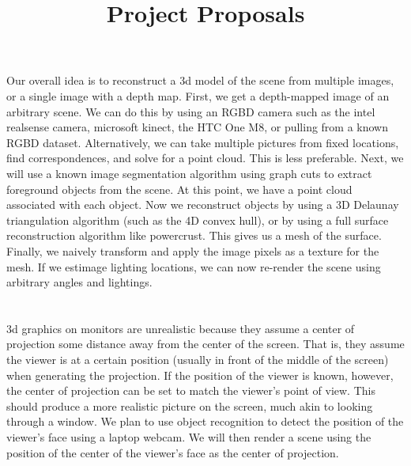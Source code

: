\documentclass[11pt]{article}
\title{Project Proposals}
\date{}
\begin{document}
\maketitle
\section{}
Our overall idea is to reconstruct a 3d model of the scene from multiple images, or a single image with a depth map. First, we get a depth-mapped image of an arbitrary scene. We can do this by using an RGBD camera such as the intel realsense camera, microsoft kinect, the   HTC One M8, or pulling from a known RGBD dataset. Alternatively, we can take multiple pictures from fixed locations, find correspondences, and solve for a point cloud. This is less preferable. Next, we will use a known image segmentation algorithm using graph cuts to extract foreground objects from the scene. At this point, we have a point cloud associated with each object. Now we reconstruct objects by using a 3D Delaunay triangulation algorithm (such as the 4D convex hull), or by using a full surface reconstruction algorithm like powercrust. This gives us a mesh of the surface. Finally, we naively transform and apply the image pixels as a texture for the mesh. If we estimage lighting locations, we can now re-render the scene using arbitrary angles and lightings.
\section{}
3d graphics on monitors are unrealistic because they assume a center of projection some distance away from the center of the screen. That is, they assume the viewer is at a certain position (usually in front of the middle of the screen) when generating the projection. If the position of the viewer is known, however, the center of projection can be set to match the viewer's point of view. This should produce a more realistic picture on the screen, much akin to looking through a window. We plan to use object recognition to detect the position of the viewer's face using a laptop webcam. We will then render a scene using the position of the center of the viewer's face as the center of projection.
\end{document}
